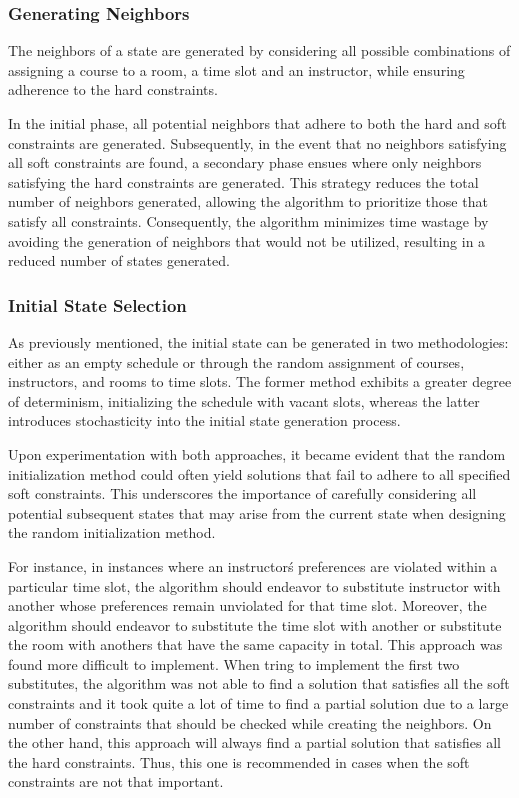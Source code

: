 \documentclass[runningheads]{paper}
\begin{document}
\subsubsection{Generating Neighbors}
The neighbors of a state are generated by considering all possible combinations 
of assigning a course to a room, a time slot and an instructor, while ensuring 
adherence to the hard constraints.

In the initial phase, all potential neighbors that adhere to both the hard and 
soft constraints are generated. Subsequently, in the event that no neighbors 
satisfying all soft constraints are found, a secondary phase ensues where only 
neighbors satisfying the hard constraints are generated. This strategy reduces 
the total number of neighbors generated, allowing the algorithm to prioritize 
those that satisfy all constraints. Consequently, the algorithm minimizes time 
wastage by avoiding the generation of neighbors that would not be utilized, 
resulting in a reduced number of states generated.

\subsubsection{Initial State Selection}
As previously mentioned, the initial state can be generated in two methodologies: either 
as an empty schedule or through the random assignment of courses, instructors, 
and rooms to time slots. The former method exhibits a greater degree of 
determinism, initializing the schedule with vacant slots, whereas the latter 
introduces stochasticity into the initial state generation process.

Upon experimentation with both approaches, it became evident that the random 
initialization method could often yield solutions that fail to adhere to all 
specified soft constraints. This underscores the importance of carefully 
considering all potential subsequent states that may arise from the current 
state when designing the random initialization method.

For instance, in instances where an instructor\'s preferences are violated within 
a particular time slot, the algorithm should endeavor to substitute instructor with 
another whose preferences remain unviolated for that time slot. Moreover, the 
algorithm should endeavor to substitute the time slot with another or substitute
the room with anothers that have the same capacity in total. This approach
was found more difficult to implement. When tring to implement the first two
substitutes, the algorithm was not able to find a solution that satisfies all the
soft constraints and it took quite a lot of time to find a partial solution due to
a large number of constraints that should be checked while creating the neighbors.
On the other hand, this approach will always find a partial solution that 
satisfies all the hard constraints. Thus, this one is recommended in cases 
when the soft constraints are not that important.
\end{document}
